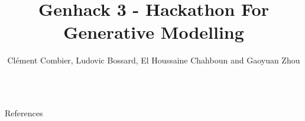 \documentclass[final]{beamer}
\title{Genhack 3 - Hackathon For Generative Modelling}
\author{Clément Combier, Ludovic Bossard, El Houssaine Chahboun and Gaoyuan Zhou}
\institute[shortinst]{Deneter's Vision, École Polytechnique and PNB Paribas}
\begin{document}
\begin{frame}[t]
\begin{columns}[t]
\separatorcolumn

\begin{column}{\colwidth}
\end{column}

\separatorcolumn

\begin{column}{\colwidth}
\end{column}

\separatorcolumn
\end{columns}

\begin{block}{References} 
  \AtNextBibliography{\small}
  \printbibliography
\end{block}
\end{frame}
\end{document}
